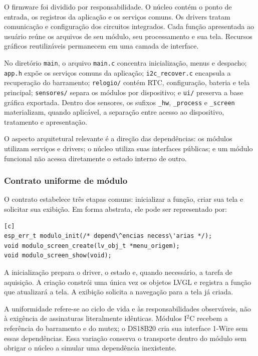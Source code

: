 \documentclass[a4paper,12pt]{article}
\begin{document}
O firmware foi dividido por responsabilidade. O n\'ucleo cont\'em o ponto de entrada, os registros da aplica\c{c}\~ao e os servi\c{c}os comuns. Os drivers tratam comunica\c{c}\~ao e configura\c{c}\~ao dos circuitos integrados. Cada fun\c{c}\~ao apresentada ao usu\'ario re\'une os arquivos de seu m\'odulo, seu processamento e sua tela. Recursos gr\'aficos reutiliz\'aveis permanecem em uma camada de interface.


No diret\'orio \texttt{main}, o arquivo \texttt{main.c} concentra inicializa\c{c}\~ao, menus e despacho; \texttt{app.h} exp\~oe os servi\c{c}os comuns da aplica\c{c}\~ao; \texttt{i2c\_recover.c} encapsula a recupera\c{c}\~ao do barramento; \texttt{relogio/} cont\'em RTC, configura\c{c}\~ao, bateria e tela principal; \texttt{sensores/} separa os m\'odulos por dispositivo; e \texttt{ui/} preserva a base gr\'afica exportada. Dentro dos sensores, os sufixos \texttt{\_hw}, \texttt{\_process} e \texttt{\_screen} materializam, quando aplic\'avel, a separa\c{c}\~ao entre acesso ao dispositivo, tratamento e apresenta\c{c}\~ao.


O aspecto arquitetural relevante \'e a dire\c{c}\~ao das depend\^encias: os m\'odulos utilizam servi\c{c}os e drivers; o n\'ucleo utiliza suas interfaces p\'ublicas; e um m\'odulo funcional n\~ao acessa diretamente o estado interno de outro.


\subsubsection{Contrato uniforme de m\'odulo}


O contrato estabelece tr\^es etapas comuns: inicializar a fun\c{c}\~ao, criar sua tela e solicitar sua exibi\c{c}\~ao. Em forma abstrata, ele pode ser representado por:


\begin{verbatim}
[c]
esp_err_t modulo_init(/* depend\^encias necess\'arias */);
void modulo_screen_create(lv_obj_t *menu_origem);
void modulo_screen_show(void);
\end{verbatim}


A inicializa\c{c}\~ao prepara o driver, o estado e, quando necess\'ario, a tarefa de aquisi\c{c}\~ao. A cria\c{c}\~ao constr\'oi uma \'unica vez os objetos LVGL e registra a fun\c{c}\~ao que atualizar\'a a tela. A exibi\c{c}\~ao solicita a navega\c{c}\~ao para a tela j\'a criada.


A uniformidade refere-se ao ciclo de vida e \`as responsabilidades observ\'aveis, n\~ao \`a exig\^encia de assinaturas literalmente id\^enticas. M\'odulos I$^2$C recebem a refer\^encia do barramento e do mutex; o DS18B20 cria sua interface 1-Wire sem essas depend\^encias. Essa varia\c{c}\~ao conserva o transporte dentro do m\'odulo sem obrigar o n\'ucleo a simular uma depend\^encia inexistente.
\end{document}
